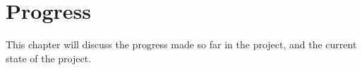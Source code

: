 \chapter{Progress}
This chapter will discuss the progress made so far in the project, and the current state of the project.

\begingroup
\let\clearpage\relax



\endgroup